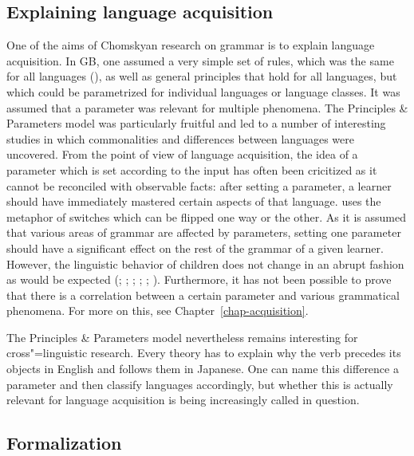 \subsection{Explaining language acquisition}
\label{sec-acquisition-gb}

One of the aims of Chomskyan research on grammar is to explain language acquisition. In GB, one
assumed a very simple set of rules, which was the same for all languages (\xbart), as well as
general principles that hold for all languages, but which could be parametrized for individual
languages or language classes. It was assumed that a parameter was relevant for multiple phenomena.
The Principles \& Parameters model was particularly fruitful and led to a number of interesting
studies in which commonalities and differences between languages were uncovered. From the point of
view of language acquisition, the idea of a parameter which is set according to the input has often
been cricitized as it cannot be reconciled with observable facts: after setting a parameter, a
learner should have immediately mastered certain aspects of that language. \citet[]{Chomsky86} uses the metaphor of switches which can be flipped one way or the other. As it is
assumed that various areas of grammar are affected by parameters, setting one parameter should have
a significant effect on the rest of the grammar of a given learner.  However, the linguistic
behavior of children does not change in an abrupt fashion as would be expected (\citealp[]{Bloom93a}; \citealp[]{Haider93a}; \citealp[]{Abney96a};
\citealp[Section~9.1]{AW98a}; \citealp{Tomasello2000a,Tomasello2003a};
\citealp{Newmeyer2005a}).  Furthermore, it has not been possible to prove that there is
a correlation between a certain parameter and various grammatical phenomena. For more on this, see
Chapter~\ref{chap-acquisition}.


The Principles \& Parameters model nevertheless remains interesting for cross"=linguistic
research. Every theory has to explain why the verb precedes its objects in English and follows them in 
Japanese. One can name this difference a parameter and then classify languages
accordingly, but whether this is actually relevant for language acquisition is being increasingly called in question.

\subsection{Formalization}
\label{sec-formalization-gb}
\addlines

